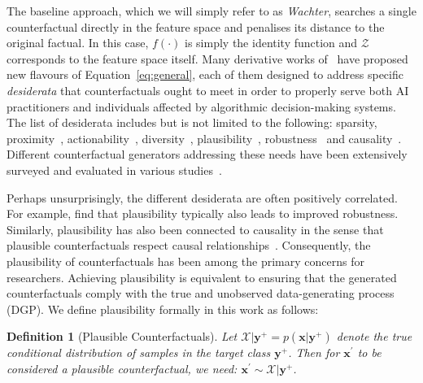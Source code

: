 \documentclass{article}
\newtheorem{definition}{Definition}[section]
\begin{document}
The baseline approach, which we will simply refer to as \textit{Wachter}, searches a single counterfactual directly in the feature space and penalises its distance to the original factual. In this case, $f(\cdot)$ is simply the identity function and $\mathcal{Z}$ corresponds to the feature space itself. Many derivative works of~\citet{wachter2017counterfactual} have proposed new flavours of Equation~\ref{eq:general}, each of them designed to address specific \textit{desiderata} that counterfactuals ought to meet in order to properly serve both AI practitioners and individuals affected by algorithmic decision-making systems. The list of desiderata includes but is not limited to the following: sparsity, proximity~\citep{wachter2017counterfactual}, actionability~\citep{ustun2019actionable}, diversity~\citep{mothilal2020explaining}, plausibility~\citep{joshi2019realistic,poyiadzi2020face,schut2021generating}, robustness~\citep{upadhyay2021robust,pawelczyk2022probabilistically,altmeyer2023endogenous} and causality~\citep{karimi2021algorithmic}. Different counterfactual generators addressing these needs have been extensively surveyed and evaluated in various studies~\citep{verma2020counterfactual,karimi2020survey,pawelczyk2021carla,artelt2021evaluating,guidotti2022counterfactual}. 

Perhaps unsurprisingly, the different desiderata are often positively correlated. For example, \citet{artelt2021evaluating} find that plausibility typically also leads to improved robustness. Similarly, plausibility has also been connected to causality in the sense that plausible counterfactuals respect causal relationships~\citep{mahajan2020preserving}. Consequently, the plausibility of counterfactuals has been among the primary concerns for researchers. Achieving plausibility is equivalent to ensuring that the generated counterfactuals comply with the true and unobserved data-generating process (DGP). We define plausibility formally in this work as follows:

\begin{definition}[Plausible Counterfactuals]
  \label{def:plausible}
  Let $\mathcal{X}|\mathbf{y}^+= p(\mathbf{x}|\mathbf{y}^+)$ denote the true conditional distribution of samples in the target class $\mathbf{y}^+$. Then for $\mathbf{x}^{\prime}$ to be considered a plausible counterfactual, we need: $\mathbf{x}^{\prime} \sim \mathcal{X}|\mathbf{y}^+$.
\end{definition}
\end{document}
